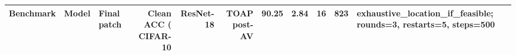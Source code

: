 \begin{tabular}{lllrrrrl}
\toprule
Benchmark & Model & Final patch & Clean ACC (%
\midrule
CIFAR-10 & ResNet-18 & TOAP post-AV & 90.25 & 2.84 & 16 & 823 & exhaustive_location_if_feasible; rounds=3, restarts=5, steps=500 \\
\bottomrule
\end{tabular}

